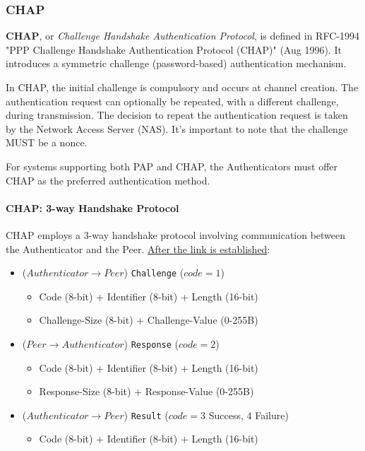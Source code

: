 \subsubsection{CHAP}
\textbf{CHAP}, or \textit{Challenge Handshake Authentication Protocol}, is defined in RFC-1994 "PPP Challenge Handshake Authentication Protocol (CHAP)" (Aug 1996). It introduces a symmetric challenge (password-based) authentication mechanism.

In CHAP, the initial challenge is compulsory and occurs at channel creation. The authentication request can optionally be repeated, with a different challenge, during transmission. The decision to repeat the authentication request is taken by the Network Access Server (NAS). It's important to note that the challenge MUST be a nonce.

For systems supporting both PAP and CHAP, the Authenticators must offer CHAP as the preferred authentication method.

\paragraph{CHAP: 3-way Handshake Protocol}
CHAP employs a 3-way handshake protocol involving communication between the Authenticator and the Peer.
\underline{After the link is established}:

\begin{itemize}
	\item ($Authenticator \rightarrow Peer$) \texttt{Challenge} ($code=1$)
	      \begin{itemize}
		      \item Code (8-bit) + Identifier (8-bit) + Length (16-bit)
		      \item Challenge-Size (8-bit) + Challenge-Value (0-255B)
	      \end{itemize}
	\item ($Peer \rightarrow Authenticator$) \texttt{Response} ($code=2$)
	      \begin{itemize}
		      \item Code (8-bit) + Identifier (8-bit) + Length (16-bit)
		      \item Response-Size (8-bit) + Response-Value (0-255B)
	      \end{itemize}
	\item ($Authenticator \rightarrow Peer$) \texttt{Result} ($code= 3$ Success, $4$ Failure)
	      \begin{itemize}
		      \item Code (8-bit) + Identifier (8-bit) + Length (16-bit)
	      \end{itemize}
\end{itemize}

